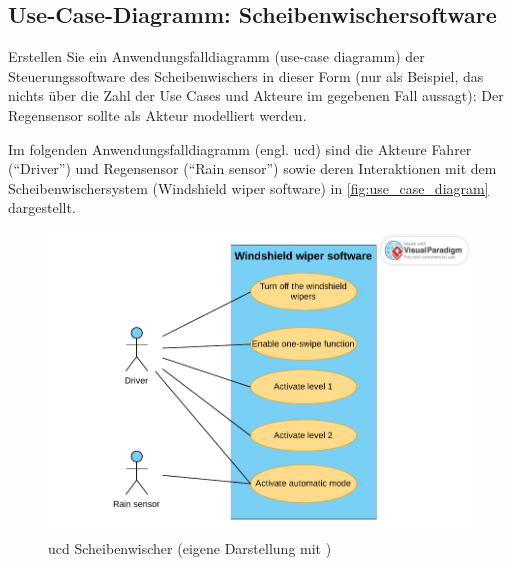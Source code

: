 \documentclass[
%
ngerman %
%
numeric %
]{wbh-assignment}
\begin{document}
\subsection{Use-Case-Diagramm: Scheibenwischersoftware}
\begin{aufgabenstellung}
Erstellen Sie ein Anwendungsfalldiagramm (use-case diagramm) der Steuerungssoftware des Scheibenwischers in dieser Form (nur als Beispiel, das nichts über die Zahl der Use Cases und Akteure im gegebenen Fall aussagt): Der Regensensor sollte als Akteur modelliert werden.
\end{aufgabenstellung}

\vspace*{5mm}

Im folgenden Anwendungsfalldiagramm (engl. \ac{ucd}) sind die Akteure Fahrer (\enquote{Driver}) und Regensensor (\enquote{Rain sensor}) sowie deren Interaktionen mit dem Scheibenwischersystem (Windshield wiper software) in \autoref{fig:use_case_diagram} dargestellt.

\vspace*{5mm}

\begin{figure}[htb!]
	\centering
	\includegraphics[width=1\linewidth]{Images/use_case_diagramm.pdf}
	\caption[\ac{ucd} Scheibenwischer (eigene Darstellung mit \cite{VisualParadigmOnlineProduktivitatssuite})]{\ac{ucd} Scheibenwischer (eigene Darstellung mit \cite{VisualParadigmOnlineProduktivitatssuite})}
	\label{fig:use_case_diagram}
\end{figure}

\clearpage

\end{document}
